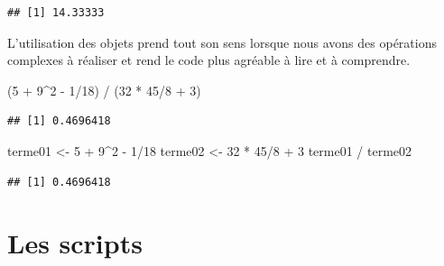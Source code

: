 \documentclass[twoside,symmetric]{book}
\newenvironment{Shaded}{}{}
\newcommand{\DecValTok}[1]{#1}
\newcommand{\NormalTok}[1]{#1}
\newcommand{\OperatorTok}[1]{#1}
\newcommand{\StringTok}[1]{#1}
\begin{document}
\begin{verbatim}
## [1] 14.33333
\end{verbatim}

L'utilisation des objets prend tout son sens lorsque nous avons des opérations complexes à réaliser et rend le code plus agréable à lire et à comprendre.

\begin{Shaded}
\begin{Highlighting}[]
\NormalTok{(}\DecValTok{5} \OperatorTok{+}\StringTok{ }\DecValTok{9}\OperatorTok{^}\DecValTok{2} \OperatorTok{-}\StringTok{ }\DecValTok{1}\OperatorTok{/}\DecValTok{18}\NormalTok{) }\OperatorTok{/}\StringTok{ }\NormalTok{(}\DecValTok{32} \OperatorTok{*}\StringTok{ }\DecValTok{45}\OperatorTok{/}\DecValTok{8} \OperatorTok{+}\StringTok{ }\DecValTok{3}\NormalTok{)}
\end{Highlighting}
\end{Shaded}

\begin{verbatim}
## [1] 0.4696418
\end{verbatim}

\begin{Shaded}
\begin{Highlighting}[]
\NormalTok{terme01 <-}\StringTok{ }\DecValTok{5} \OperatorTok{+}\StringTok{ }\DecValTok{9}\OperatorTok{^}\DecValTok{2} \OperatorTok{-}\StringTok{ }\DecValTok{1}\OperatorTok{/}\DecValTok{18}
\NormalTok{terme02 <-}\StringTok{ }\DecValTok{32} \OperatorTok{*}\StringTok{ }\DecValTok{45}\OperatorTok{/}\DecValTok{8} \OperatorTok{+}\StringTok{ }\DecValTok{3}
\NormalTok{terme01 }\OperatorTok{/}\StringTok{ }\NormalTok{terme02}
\end{Highlighting}
\end{Shaded}

\begin{verbatim}
## [1] 0.4696418
\end{verbatim}

\hypertarget{les-scripts}{%
\section{Les scripts}\label{les-scripts}}
\end{document}
